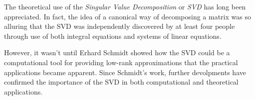 
\label{lab:SVD}



The theoretical use of the \emph{Singular Value Decomposition} or \emph{SVD} has long been appreciated.
In fact, the idea of a canonical way of decomposing a matrix was so alluring that the SVD was independently discovered by at least four people through use of both  integral equations and systems of linear equations.

However, it wasn't until Erhard Schmidt showed how the SVD could be a computational tool for providing low-rank approximations that the practical applications became apparent.
Since Schmidt's work, further devolpments have confirmed the importance of the SVD in both computational and theoretical applications.

